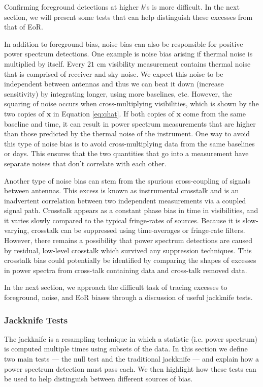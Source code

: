 \documentclass[preprint2,numberedappendix,tighten]{aastex6}  %
\begin{document}
Confirming foreground detections at higher $k$'s is more difficult. In the next section, we will present some tests that can help distinguish these excesses from that of EoR. 

In addition to foreground bias, noise bias can also be responsible for positive power spectrum detections. One example is noise bias arising if thermal noise is multiplied by itself. Every $21$ cm visibility measurement contains thermal noise that is comprised of receiver and sky noise. We expect this noise to be independent between antennas and thus we can beat it down (increase sensitivity) by integrating longer, using more baselines, etc. However, the squaring of noise occurs when cross-multiplying visibilities, which is shown by the two copies of $\textbf{x}$ in Equation \ref{eq:qhat}. If both copies of $\textbf{x}$ come from the same baseline and time, it can result in power spectrum measurements that are higher than those predicted by the thermal noise of the instrument. One way to avoid this type of noise bias is to avoid cross-multiplying data from the same baselines or days. This ensures that the two quantities that go into a measurement have separate noises that don't correlate with each other. 

Another type of noise bias can stem from the spurious cross-coupling of signals between antennas. This excess is known as instrumental crosstalk and is an inadvertent correlation between two independent measurements via a coupled signal path. Crosstalk appears as a constant phase bias in time in visibilities, and it varies slowly compared to the typical fringe-rates of sources. Because it is slow-varying, crosstalk can be suppressed using time-averages or fringe-rate filters. However, there remains a possibility that power spectrum detections are caused by residual, low-level crosstalk which survived any suppression techniques. This crosstalk bias could potentially be identified by comparing the shapes of excesses in power spectra from cross-talk containing data and cross-talk removed data.

In the next section, we approach the difficult task of tracing excesses to foreground, noise, and EoR biases through a discussion of useful jackknife tests.

\subsubsection{Jackknife Tests}

The jackknife is a resampling technique in which a statistic (i.e. power spectrum) is computed multiple times using subsets of the data. In this section we define two main tests --- the null test and the traditional jackknife --- and explain how a power spectrum detection must pass each. We then highlight how these tests can be used to help distinguish between different sources of bias.
 
\end{document}
